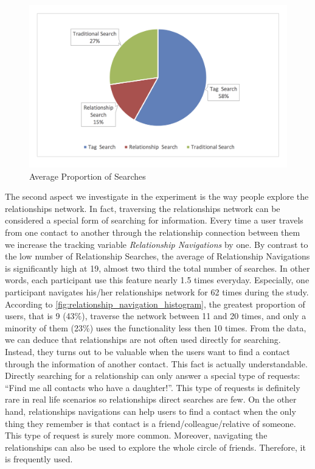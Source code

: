 \begin{figure}[!h]
\begin{centering}
\includegraphics[scale=0.68]{pics/search_percentage.png}
\caption{Average Proportion of Searches}\label{fig:search_percentage}
\end{centering}
\end{figure}

The second aspect we investigate in the experiment is the way people explore the relationships network. In fact, traversing the relationships network can be considered a special form of searching for information. Every time a user travels from one contact to another through the relationship connection between them we increase the tracking variable \textit{Relationship Navigations} by one. By contrast to the low number of Relationship Searches, the average of Relationship Navigations is significantly high at 19, almost two third the total number of searches. In other words, each participant use this feature nearly 1.5 times everyday. Especially, one participant navigates his/her relationships network for 62 times during the study. According to \autoref{fig:relationship_navigation_histogram}, the greatest proportion of users, that is 9 (43\%), traverse the network between 11 and 20 times, and only a minority of them (23\%) uses the functionality less then 10 times. From the data, we can deduce that relationships are not often used directly for searching. Instead, they turns out to be valuable when the users want to find a contact through the information of another contact. This fact is actually understandable. Directly searching for a relationship can only answer a special type of requests: ``Find me all contacts who have a daughter!''. This type of requests is definitely rare in real life scenarios so relationships direct searches are few. On the other hand, relationships navigations can help users to find a contact when the only thing they remember is that contact is a friend/colleague/relative of someone. This type of request is surely more common. Moreover, navigating the relationships can also be used to explore the whole circle of friends. Therefore, it is frequently used.

